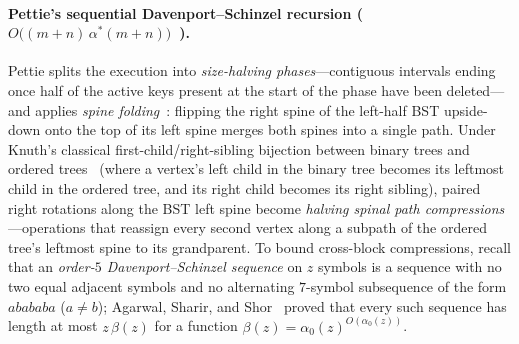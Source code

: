 \documentclass[11pt]{article}
\theoremstyle{definition}
\theoremstyle{remark}
\begin{document}
\paragraph{Pettie's sequential Davenport--Schinzel recursion ($O\big((m + n)\,\alpha^*(m + n)\big)$~\cite{Pettie2008}).}
Pettie splits the execution into \emph{size-halving phases}---contiguous intervals ending once half of the active keys present at the start of the phase have been deleted---and applies \emph{spine folding}~\cite[Section~2, Observation~2.1 and Figure~2]{Pettie2008}: flipping the right spine of the left-half BST upside-down onto the top of its left spine merges both spines into a single path. Under Knuth's classical first-child/right-sibling bijection between binary trees and ordered trees~\cite[Section~2.3.2]{Knuth1997Vol1} (where a vertex's left child in the binary tree becomes its leftmost child in the ordered tree, and its right child becomes its right sibling), paired right rotations along the BST left spine become \emph{halving spinal path compressions}---operations that reassign every second vertex along a subpath of the ordered tree's leftmost spine to its grandparent. To bound cross-block compressions, recall that an \emph{order-$5$ Davenport--Schinzel sequence} on $z$ symbols is a sequence with no two equal adjacent symbols and no alternating $7$-symbol subsequence of the form $a b a b a b a$ ($a \ne b$); Agarwal, Sharir, and Shor~\cite{AgarwalSharirShor1989} proved that every such sequence has length at most $z\,\beta(z)$ for a function $\beta(z) = \alpha_0(z)^{O(\alpha_0(z))}$.
\end{document}
